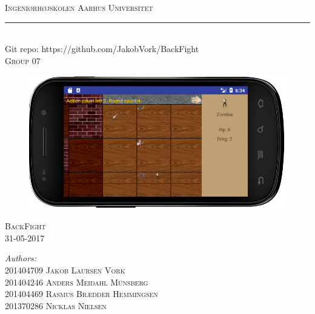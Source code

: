 \begin{titlingpage}
	\center %
	
	\textsc{\LARGE Ingeniørhøjskolen Aarhus Universitet}
	\noindent\hfil\rule{0.9\textwidth}{.4pt}\\
	Git repo: https://github.com/JakobVork/BackFight\\[2.5cm]
	\textsc{Group 07}
	
	\begin{figure}[ht!]
		\centering
		\includegraphics[width=130mm]{images/FrontpageImage.png}
	\end{figure}
	

	\begin{vplace}[0.7]
		\textsc{\LARGE BackFight}\\
		\textsc{\large 31-05-2017}\\[0.5cm]		
		\vspace{15mm}
	
		\begin{minipage}{0.55\textwidth}
			\begin{flushleft} \large
				
				\emph{Authors:}\\ 
				
				201404709 \textsc{Jakob Laursen Vork}\\
				201404246 \textsc{Anders Meidahl Münsberg}\\
				201404469 \textsc{Rasmus Brædder Hemmingsen}\\
				201370286 \textsc{Nicklas Nielsen}\\
				
			\end{flushleft}
		\end{minipage}

	\end{vplace}	
\end{titlingpage}